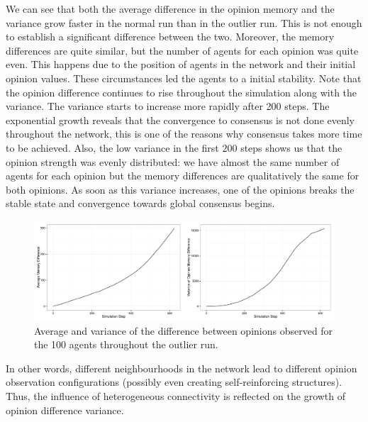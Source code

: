 \documentclass[preprint,number]{elsarticle}
\begin{document}
      We can see that both the average difference in the opinion memory and the variance grow faster
      in the normal run than in the outlier run. This is not enough to establish a significant
      difference between the two. Moreover, the memory differences are quite similar, but the number
      of agents for each opinion was quite even. This happens due to the position of agents in the
      network and their initial opinion values. These circumstances led the agents to a initial
      stability. Note that the opinion difference continues to rise throughout the simulation along
      with the variance. The variance starts to increase more rapidly after 200 steps. The
      exponential growth reveals that the convergence to consensus is not done evenly throughout the
      network, this is one of the reasons why consensus takes more time to be achieved. Also, the
      low variance in the first $200$ steps shows us that the opinion strength was evenly
      distributed: we have almost the same number of agents for each opinion but the memory
      differences are qualitatively the same for both opinions. As soon as this variance increases,
      one of the opinions breaks the stable state and convergence towards global consensus begins.

      \begin{figure}[H]
	\centering
	\includegraphics[width=1\linewidth]{"../analysis/pdf/cp-regular-outlier-fullrun-memory-diff"}
	\begin{minipage}{0.9\textwidth}
          \caption{Average and variance of the difference between opinions observed for the 100
            agents throughout the outlier run.}
          \label{fig:ctx_perm_kreg_run_outlier_diff_full}
	\end{minipage}
      \end{figure}

      \noindent In other words, different neighbourhoods in the network lead to different opinion
      observation configurations (possibly even creating self-reinforcing structures). Thus, the
      influence of heterogeneous connectivity is reflected on the growth of opinion difference
      variance.
\end{document}
